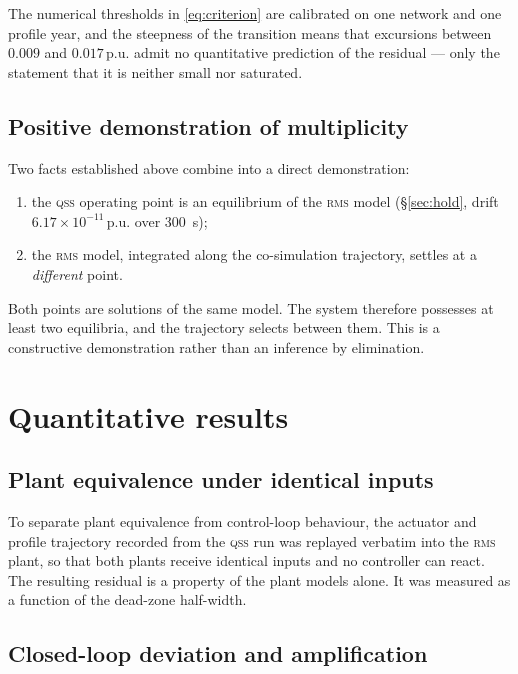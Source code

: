\documentclass[11pt,a4paper]{article}
\newcommand{\pu}{\ensuremath{\mathrm{p.u.}}}
\newcommand{\qss}{\textsc{qss}}
\newcommand{\rms}{\textsc{rms}}
\begin{document}
The numerical thresholds in \eqref{eq:criterion} are calibrated on one
network and one profile year, and the steepness of the transition means that
excursions between $0.009$ and $0.017\,\pu$ admit no quantitative prediction
of the residual --- only the statement that it is neither small nor
saturated.

\subsection{Positive demonstration of multiplicity}

Two facts established above combine into a direct demonstration:

\begin{enumerate}
  \item the \qss{} operating point is an equilibrium of the \rms{} model
        (\S\ref{sec:hold}, drift $6.17\times10^{-11}\,\pu$ over
        \SI{300}{\second});
  \item the \rms{} model, integrated along the co-simulation trajectory,
        settles at a \emph{different} point.
\end{enumerate}

Both points are solutions of the same model. The system therefore possesses
at least two equilibria, and the trajectory selects between them. This is a
constructive demonstration rather than an inference by elimination.

\section{Quantitative results}
\label{sec:uy}

\subsection{Plant equivalence under identical inputs}

To separate plant equivalence from control-loop behaviour, the actuator and
profile trajectory recorded from the \qss{} run was replayed verbatim into
the \rms{} plant, so that both plants receive identical inputs and no
controller can react. The resulting residual is a property of the plant
models alone. It was measured as a function of the dead-zone half-width.

\subsection{Closed-loop deviation and amplification}
\end{document}
